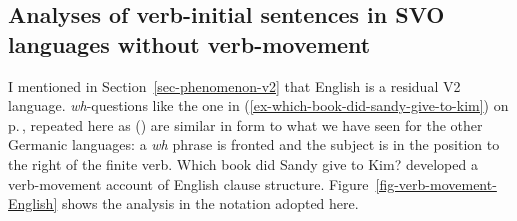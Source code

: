 


\subsection{Analyses of verb-initial sentences in SVO languages without verb-movement}
\label{sec-aux-flat}

I mentioned in Section~\ref{sec-phenomenon-v2} that English is a residual V2
language. \emph{wh}-questions like the one in (\ref{ex-which-book-did-sandy-give-to-kim}) on
p.\,\pageref{ex-which-book-did-sandy-give-to-kim}, repeated here as () are similar in form to what we
have seen for the other Germanic languages: a \emph{wh} phrase is fronted and the subject is in the
position to the right of the finite verb.
\ea
Which book did Sandy give to Kim?
\z
\noindent
\citet{Borsley89} developed a verb-movement account of English clause
structure. Figure~\ref{fig-verb-movement-English} shows the analysis in the notation adopted here.

